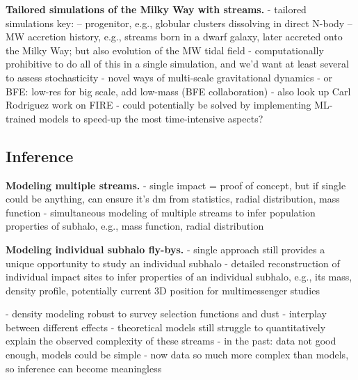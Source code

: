 \documentclass[final,5p,times,twocolumn,authoryear]{elsarticle}
\begin{document}
\textbf{Tailored simulations of the Milky Way with streams.}
- tailored simulations key:
-- progenitor, e.g., globular clusters dissolving in direct N-body
-- MW accretion history, e.g., streams born in a dwarf galaxy, later accreted onto the Milky Way; but also evolution of the MW tidal field
- computationally prohibitive to do all of this in a single simulation, and we'd want at least several to assess stochasticity
- novel ways of multi-scale gravitational dynamics
- or BFE: low-res for big scale, add low-mass (BFE collaboration)
- also look up Carl Rodriguez work on FIRE
- could potentially be solved by implementing ML-trained models to speed-up the most time-intensive aspects?



\subsection{Inference}
\textbf{Modeling multiple streams.}
- single impact = proof of concept, but if single could be anything, can ensure it's dm from statistics, radial distribution, mass function
- simultaneous modeling of multiple streams to infer population properties of subhalo, e.g., mass function, radial distribution

\textbf{Modeling individual subhalo fly-bys.}
- single approach still provides a unique opportunity to study an individual subhalo
- detailed reconstruction of individual impact sites to infer properties of an individual subhalo, e.g., its mass, density profile, potentially current 3D position for multimessenger studies

- density modeling robust to survey selection functions and dust \citep{patrick:2022}
- interplay between different effects
- theoretical models still struggle to quantitatively explain the observed complexity of these streams
- in the past: data not good enough, models could be simple
- now data so much more complex than models, so inference can become meaningless

\end{document}

